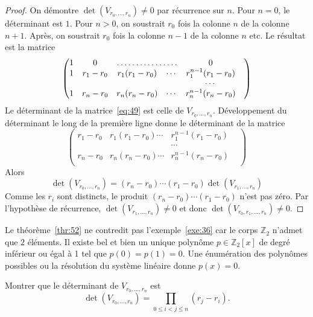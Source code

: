 \begin{proof}
   On démontre  $\det(V_{r_0,\dots,r_n}) ≠0$ par récurrence sur $n$. Pour $n = 0$, le déterminant est $1$. Pour $n>0$, on soustrait $r_0$ fois la colonne $n$ de la colonne $n+1$. Après, on soustrait $r_0$ fois la colonne $n-1$ de la colonne $n$ etc. Le résultat est la matrice
   \begin{equation}
     \label{eq:49}
     \begin{pmatrix}
       1 & 0  &      \hdotsfor{2} &  0 \\
       1 & r_1- r_0&  r_1 (r_1-r_0)  & \cdots & r_1^{n-1} (r_1 - r_0) \\
       & & &  & \cdots  &  \\
       1 & r_n -r_0&  r_n (r_n-r_0) & \cdots & r_n^{n-1} (r_n - r_0) \\
     \end{pmatrix}
   \end{equation}
   Le déterminant de la matrice~\eqref{eq:49} est celle de
   $V_{r_0,\dots,r_n}$. Développement du déterminant le long de la
   première ligne donne le déterminant de la matrice
 \begin{equation}
\label{eq:50}
    \begin{pmatrix}
       r_1- r_0&  r_1 (r_1-r_0) \cdots & r_1^{n-1} (r_1 - r_0) \\
        & &  \cdots  &  \\
        r_n -r_0&  r_n (r_n-r_0) \cdots & r_n^{n-1} (r_n - r_0) \\
     \end{pmatrix}
   \end{equation}
   Alors
   \begin{displaymath}
     \det(V_{r_0,\dots,r_n})  = (r_n-r_0) \cdots (r_1-r_0)  \det(V_{r_1,\dots,r_n})
   \end{displaymath}      
Comme les $r_i$ sont distincts, le produit   $(r_n-r_0) \cdots (r_1-r_0) $ n'est pas zéro. Par l'hypothèse de récurrence, $\det(V_{r_1,\dots,r_n}) ≠0$ et donc $\det(V_{r_0,r_1,\dots,r_n}) ≠0$.  
\end{proof}

Le théorème~\ref{thr:52} ne contredit pas l'exemple~\ref{exe:36} car le corps $ℤ_2$ n'admet que $2$ éléments. Il existe bel et bien un unique polynôme $p \in  ℤ_2[x]$ de degré inférieur ou égal à 1 tel que $p(0) = p(1) = 0$. Une énumération des polynômes possibles ou la résolution du système linéaire donne $p(x)=0$.

\begin{exercise}
  \label{exe:37}
  Montrer que le déterminant de $V_{r_0,\dots,r_n}$ est
  \begin{displaymath}
    \det (V_{r_0,\dots,r_n}) = ∏_{0 ≤ i<j ≤n} (r_j - r_i). 
  \end{displaymath}
\end{exercise}



